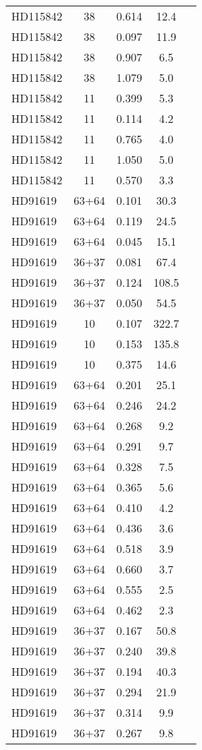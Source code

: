 \begin{table*}
\begin{tabular}{l c c c c}
HD115842 & 38 & 0.614 & 12.4\\ 
HD115842 & 38 & 0.097 & 11.9\\ 
HD115842 & 38 & 0.907 & 6.5\\ 
HD115842 & 38 & 1.079 & 5.0\\ 
HD115842 & 11 & 0.399 & 5.3\\ 
HD115842 & 11 & 0.114 & 4.2\\ 
HD115842 & 11 & 0.765 & 4.0\\ 
HD115842 & 11 & 1.050 & 5.0\\ 
HD115842 & 11 & 0.570 & 3.3\\ 
\hline
HD91619 & 63+64 & 0.101 & 30.3\\ 
HD91619 & 63+64 & 0.119 & 24.5\\ 
HD91619 & 63+64 & 0.045 & 15.1\\ 
HD91619 & 36+37 & 0.081 & 67.4\\ 
HD91619 & 36+37 & 0.124 & 108.5\\ 
HD91619 & 36+37 & 0.050 & 54.5\\ 
HD91619 & 10 & 0.107 & 322.7\\ 
HD91619 & 10 & 0.153 & 135.8\\ 
HD91619 & 10 & 0.375 & 14.6\\ 
HD91619 & 63+64 & 0.201 & 25.1\\ 
HD91619 & 63+64 & 0.246 & 24.2\\ 
HD91619 & 63+64 & 0.268 & 9.2\\ 
HD91619 & 63+64 & 0.291 & 9.7\\ 
HD91619 & 63+64 & 0.328 & 7.5\\ 
HD91619 & 63+64 & 0.365 & 5.6\\ 
HD91619 & 63+64 & 0.410 & 4.2\\ 
HD91619 & 63+64 & 0.436 & 3.6\\ 
HD91619 & 63+64 & 0.518 & 3.9\\ 
HD91619 & 63+64 & 0.660 & 3.7\\ 
HD91619 & 63+64 & 0.555 & 2.5\\ 
HD91619 & 63+64 & 0.462 & 2.3\\ 
HD91619 & 36+37 & 0.167 & 50.8\\ 
HD91619 & 36+37 & 0.240 & 39.8\\ 
HD91619 & 36+37 & 0.194 & 40.3\\ 
HD91619 & 36+37 & 0.294 & 21.9\\ 
HD91619 & 36+37 & 0.314 & 9.9\\ 
HD91619 & 36+37 & 0.267 & 9.8\\ 

\end{tabular}
\end{table*}
